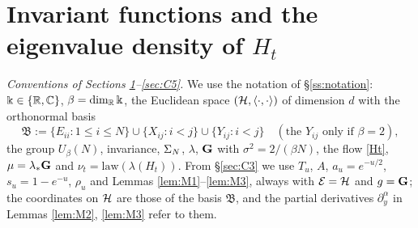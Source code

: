 \section{Invariant functions and the eigenvalue density of $H_t$}\label{sec:C4}

\noindent\emph{Conventions of Sections \ref{sec:C4}--\ref{sec:C5}.}
We use the notation of \S\ref{ss:notation}: $\Bbbk\in\{\mathbb{R},\mathbb{C}\}$, $\beta=\dim_{\mathbb{R}}\Bbbk$, the Euclidean space $(\mathcal{H},\langle\cdot,\cdot\rangle)$ of dimension $d$ with the orthonormal basis
\[\mathfrak B:=\{E_{ii}:1\le i\le N\}\cup\{X_{ij}:i<j\}\cup\{Y_{ij}:i<j\}\quad(\text{the }Y_{ij}\text{ only if }\beta=2),\]
the group $U_\beta(N)$, invariance, $\Sigma_N$, $\lambda$, $\mathbf{G}$ with $\sigma^2=2/(\beta N)$, the flow \eqref{Ht}, $\mu=\lambda_*\mathbf{G}$ and $\nu_t=\mathrm{law}(\lambda(H_t))$.
From \S\ref{sec:C3} we use $T_u$, $A$, $a_u=e^{-u/2}$, $s_u=1-e^{-u}$, $\rho_u$ and Lemmas \ref{lem:M1}--\ref{lem:M3}, always with $\mathcal E=\mathcal{H}$ and $g=\mathbf{G}$; the coordinates on $\mathcal{H}$ are those of the basis $\mathfrak B$, and the partial derivatives $\partial_y^\alpha$ in Lemmas \ref{lem:M2}, \ref{lem:M3} refer to them.

